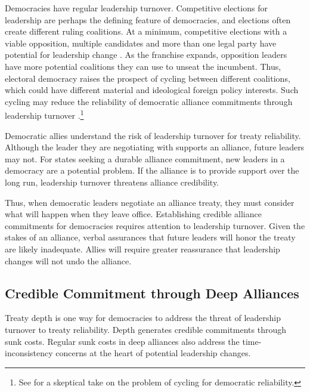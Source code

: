 \documentclass[12pt]{article}
\begin{document}
Democracies have regular leadership turnover. 
Competitive elections for leadership are perhaps the defining feature of democracies, and elections often create different ruling coalitions. 
At a minimum, competitive elections with a viable opposition, multiple candidates and more than one legal party have potential for leadership change \citep{HydeMarinov2012}. 
As the franchise expands, opposition leaders have more potential coalitions they can use to unseat the incumbent.  
Thus, electoral democracy raises the prospect of cycling between different coalitions, which could have different material and ideological foreign policy interests. 
Such cycling may reduce the reliability of democratic alliance commitments through leadership turnover \citep{GartzkeGleditsch2004}.\footnote{See \citet{Gaubatz1996} for a skeptical take on the problem of cycling for democratic reliability.}


Democratic allies understand the risk of leadership turnover for treaty reliability. 
Although the leader they are negotiating with supports an alliance, future leaders may not. 
For states seeking a durable alliance commitment, new leaders in a democracy are a potential problem. 
If the alliance is to provide support over the long run, leadership turnover threatens alliance credibility.


Thus, when democratic leaders negotiate an alliance treaty, they must consider what will happen when they leave office.
Establishing credible alliance commitments for democracies requires attention to leadership turnover. 
Given the stakes of an alliance, verbal assurances that future leaders will honor the treaty are likely inadequate.
Allies will require greater reassurance that leadership changes will not undo the alliance. 



\subsection{Credible Commitment through Deep Alliances}

Treaty depth is one way for democracies to address the threat of leadership turnover to treaty reliability. 
Depth generates credible commitments through sunk costs.
Regular sunk costs in deep alliances also address the time-inconsistency concerns at the heart of potential leadership changes.
\end{document}
